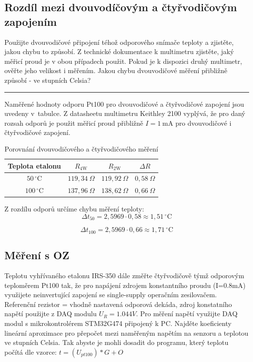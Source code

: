 \documentclass[a4paper,12pt]{article}
\newcommand{\unitC}{\,^\circ\mathrm{C}}
\begin{document}
\subsection{Rozdíl mezi dvouvodíčovým a čtyřvodičovým zapojením}

Použijte dvouvodičové připojení téhož odporového snímače teploty a zjistěte, jakou chybu to
způsobí. Z technické dokumentace k multimetru zjistěte, jaký měřicí proud je v obou případech
použit. Pokud je k dispozici druhý multimetr, ověřte jeho velikost i měřením. Jakou chybu
dvouvodičové měření přibližně způsobí - ve stupních Celsia?

\par\noindent\rule{\textwidth}{0.4pt}

Naměřené hodnoty odporu Pt100 pro dvouvodičové a čtyřvodičové zapojení jsou uvedeny v~tabulce.
Z datasheetu multimetru Keithley 2100 vyplývá, že pro daný rozsah odporů je použit
měřicí proud přibližně $I = 1\ \mathrm{mA}$ pro dvouvodičové i čtyřvodičové zapojení.

\begin{table}[H]
\centering
\begin{tabular}{|c|c|c|c|}
\hline
Teplota etalonu & $R_{\mathrm{4W}}$ & $R_{\mathrm{2W}}$ & $\Delta R$ \\
\hline
$50\unitC$  & $119{,}34\ \Omega$ & $119{,}92\ \Omega$ & $0{,}58\ \Omega$ \\
\hline
$100\unitC$ & $137{,}96\ \Omega$ & $138{,}62\ \Omega$ & $0{,}66\ \Omega$ \\
\hline
\end{tabular}
\caption{Porovnání dvouvodičového a čtyřvodičového měření}
\end{table}

Z rozdílu odporů určíme chybu měření teploty:
$$
\Delta t_{50} = 2{,}5969 \cdot 0{,}58 \approx 1{,}51\unitC
$$

$$
\Delta t_{100} = 2{,}5969 \cdot 0{,}66 \approx 1{,}71\unitC
$$

\subsection{Měření s OZ}
Teplotu vyhřívaného etalonu IRS-350 dále změřte čtyřvodičově týmž odporovým teploměrem Pt100
tak, že pro napájení zdrojem konstantního proudu (I=0.8mA) využijete neinvertující zapojení se
single-supply operačním zesilovačem. Referenční rezistor = vhodně nastavená odporová dekáda,
zdroj konstatního napětí použijte z DAQ modulu $U_R=1.044V$. Pro měření napětí využijte DAQ
modul s mikrokontrolérem STM32G474 připojený k PC. Najděte koeficienty lineární aproximace
pro přepočet mezi naměřeným napětím na senzoru a teplotou ve stupních Celsia. Tak abyste je mohli
dosadit do programu, který teplotu počítá dle vzorce: $t = (U_{pt100})*G + O$
\end{document}
